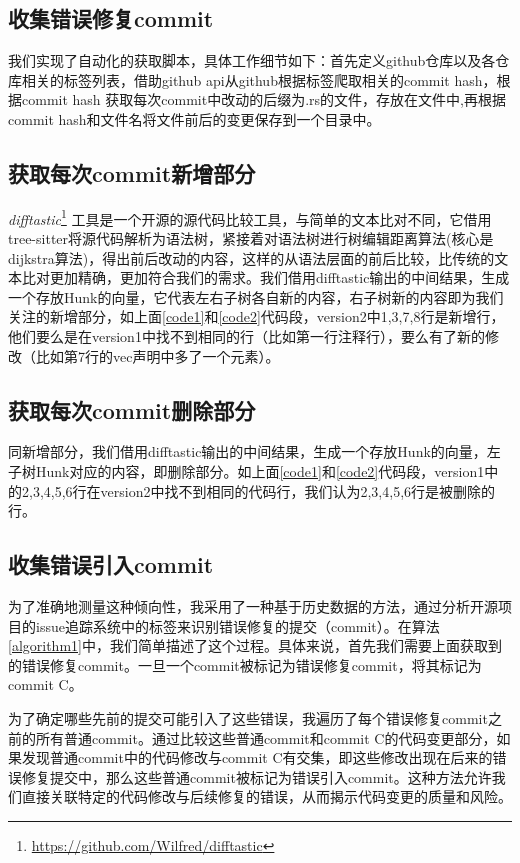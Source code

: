 \subsection{收集错误修复commit}
我们实现了自动化的获取脚本，具体工作细节如下：首先定义github仓库以及各仓库相关的标签列表，借助github api从github根据标签爬取相关的commit hash，根据commit hash 获取每次commit中改动的后缀为.rs的文件，存放在文件中,再根据commit hash和文件名将文件前后的变更保存到一个目录中。

\subsection{获取每次commit新增部分}
\textit{difftastic}\footnote{\url{https://github.com/Wilfred/difftastic}} 工具是一个开源的源代码比较工具，与简单的文本比对不同，它借用tree-sitter将源代码解析为语法树，紧接着对语法树进行树编辑距离算法(核心是dijkstra算法)\cite{bille2005survey, pawlik2011rted, demaine2007optimal}，得出前后改动的内容，这样的从语法层面的前后比较，比传统的文本比对更加精确，更加符合我们的需求。我们借用difftastic输出的中间结果，生成一个存放Hunk的向量，它代表左右子树各自新的内容，右子树新的内容即为我们关注的新增部分，如上面\ref{code1}和\ref{code2}代码段，version2中1,3,7,8行是新增行，他们要么是在version1中找不到相同的行（比如第一行注释行），要么有了新的修改（比如第7行的vec声明中多了一个元素）。

\subsection{获取每次commit删除部分}
同新增部分，我们借用difftastic输出的中间结果，生成一个存放Hunk的向量，左子树Hunk对应的内容，即删除部分。如上面\ref{code1}和\ref{code2}代码段，version1中的2,3,4,5,6行在version2中找不到相同的代码行，我们认为2,3,4,5,6行是被删除的行。

\subsection{收集错误引入commit}
为了准确地测量这种倾向性，我采用了一种基于历史数据的方法，通过分析开源项目的issue追踪系统中的标签来识别错误修复的提交（commit）。在算法\ref{algorithm1}中，我们简单描述了这个过程。具体来说，首先我们需要上面获取到的错误修复commit。一旦一个commit被标记为错误修复commit，将其标记为commit C。

为了确定哪些先前的提交可能引入了这些错误，我遍历了每个错误修复commit之前的所有普通commit。通过比较这些普通commit和commit C的代码变更部分，如果发现普通commit中的代码修改与commit C有交集，即这些修改出现在后来的错误修复提交中，那么这些普通commit被标记为错误引入commit。这种方法允许我们直接关联特定的代码修改与后续修复的错误，从而揭示代码变更的质量和风险。


